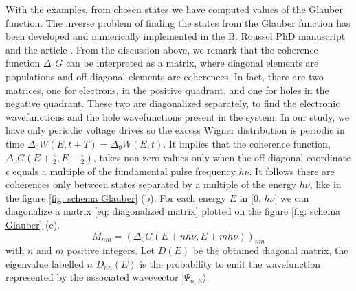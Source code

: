 With the examples, from chosen states we have computed values of the Glauber function.
The inverse problem of finding the states from the Glauber function has been developed and numerically implemented in the B. Roussel PhD manuscript \cite{roussel2017autopsy} and the article \cite{marguerite2017extracting}.
From the discussion above, we remark that the coherence function $\Delta_{0}G$ can be interpreted as a matrix, where diagonal elements are populations and off-diagonal elements are coherences.
In fact, there are two matrices, one for electrons, in the positive quadrant, and one for holes in the negative quadrant.
These two are diagonalized separately, to find the electronic wavefunctions and the hole wavefunctions present in the system.
In our study, we have only periodic voltage drives so the excess Wigner distribution is periodic in time $\Delta_{0}W(E,t+T) = \Delta_{0}W(E,t)$.
It implies that the coherence function, $\Delta_{0}G(E+\frac{\epsilon}{2},E-\frac{\epsilon}{2})$, takes non-zero values only when the off-diagonal coordinate $\epsilon$ equals a multiple of the fundamental pulse frequency $h\nu$.
It follows there are coherences only between states separated by a multiple of the energy $h\nu$, like in the figure \ref{fig: schema Glauber} (b).
For each energy $E$ in [0, $h\nu$] we can diagonalize a matrix \eqref{eq: diagonalized matrix} plotted on the figure \ref{fig: schema Glauber} (c).
\begin{equation}
M_{nm} = \left(\Delta_{0}G\left(E+nh\nu,E+mh\nu\right)\right)_{nm} \label{eq: diagonalized matrix}
\end{equation}
 with $n$ and $m$ positive integers.
Let $D(E)$ be the obtained diagonal matrix,
the eigenvalue labelled $n$ $D_{nn}(E)$ is the probability to emit the wavefunction represented by the associated wavevector $\left|\Psi_{n,E}\rangle$.
